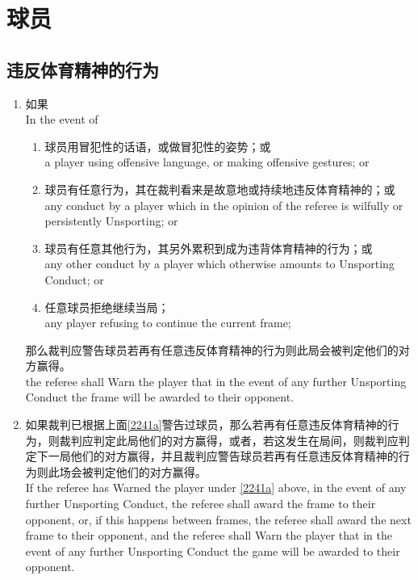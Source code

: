 \section{球员}\label{224}

\subsection{违反体育精神的行为}\label{2241}

\begin{enumerate}[label=(\alph*)]
    \item \label{2241a}如果\\
    In the event of
    \begin{enumerate}[label=(\roman*)]
        \item 球员用冒犯性的话语，或做冒犯性的姿势；或\\
        a player using offensive language, or making offensive gestures; or
        \item 球员有任意行为，其在裁判看来是故意地或持续地违反体育精神的；或\\
        any conduct by a player which in the opinion of the referee is wilfully or persistently Unsporting; or
        \item 球员有任意其他行为，其另外累积到成为违背体育精神的行为；或\\
        any other conduct by a player which otherwise amounts to Unsporting Conduct; or
        \item 任意球员拒绝继续当局；\\
        any player refusing to continue the current frame;
    \end{enumerate}
    那么裁判应警告球员若再有任意违反体育精神的行为则此局会被判定他们的对方赢得。\\
    the referee shall Warn the player that in the event of any further Unsporting Conduct the frame will be awarded to their opponent.
    \item \label{2241b}如果裁判已根据上面\ref{2241a}警告过球员，那么若再有任意违反体育精神的行为，则裁判应判定此局他们的对方赢得，或者，若这发生在局间，则裁判应判定下一局他们的对方赢得，并且裁判应警告球员若再有任意违反体育精神的行为则此场会被判定他们的对方赢得。\\
    If the referee has Warned the player under \ref{2241a} above, in the event of any further Unsporting Conduct, the referee shall award the frame to their opponent, or, if this happens between frames, the referee shall award the next frame to their opponent, and the referee shall Warn the player that in the event of any further Unsporting Conduct the game will be awarded to their opponent.

\end{enumerate}
